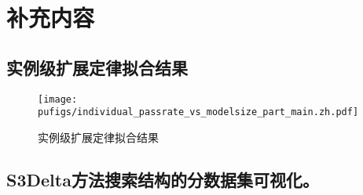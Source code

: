 
\chapter{补充内容}

\section{实例级扩展定律拟合结果}
\begin{figure}[hbp]
  \centering
  \texttt{[image: pufigs/individual\_passrate\_vs\_modelsize\_part\_main.zh.pdf]}
  \caption{实例级扩展定律拟合结果}
  \label{fig:idp_with_modelsize_part1}
\end{figure}

\clearpage
\vspace{-0.3cm}
\section{S3Delta方法搜索结构的分数据集可视化。}


